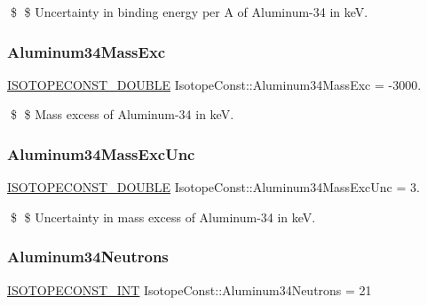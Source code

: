 \$ \$ Uncertainty in binding energy per A of Aluminum-\/34 in keV. \mbox{\label{group___isotope_const-_aluminum-_al34_ga94578f7b17ceed14c9016401747b8a04}} 
\subsubsection{\texorpdfstring{Aluminum34\+Mass\+Exc}{Aluminum34MassExc}}
{\footnotesize\ttfamily \mbox{\hyperlink{group___isotope_const-_macros_ga8f45a7272ce02c0b4c65c44636ed719a}{I\+S\+O\+T\+O\+P\+E\+C\+O\+N\+S\+T\+\_\+\+D\+O\+U\+B\+LE}} Isotope\+Const\+::\+Aluminum34\+Mass\+Exc = -\/3000.}

\$ \$ Mass excess of Aluminum-\/34 in keV. \mbox{\label{group___isotope_const-_aluminum-_al34_ga8a93d8df3b2d20cbdd15d4e8ef8bff64}} 
\subsubsection{\texorpdfstring{Aluminum34\+Mass\+Exc\+Unc}{Aluminum34MassExcUnc}}
{\footnotesize\ttfamily \mbox{\hyperlink{group___isotope_const-_macros_ga8f45a7272ce02c0b4c65c44636ed719a}{I\+S\+O\+T\+O\+P\+E\+C\+O\+N\+S\+T\+\_\+\+D\+O\+U\+B\+LE}} Isotope\+Const\+::\+Aluminum34\+Mass\+Exc\+Unc = 3.}

\$ \$ Uncertainty in mass excess of Aluminum-\/34 in keV. \mbox{\label{group___isotope_const-_aluminum-_al34_ga9a9e3f52482bb2b2a592e910a7a6a2fe}} 
\subsubsection{\texorpdfstring{Aluminum34\+Neutrons}{Aluminum34Neutrons}}
{\footnotesize\ttfamily \mbox{\hyperlink{group___isotope_const-_macros_ga5f18360b3e99483a35c32d789e62621c}{I\+S\+O\+T\+O\+P\+E\+C\+O\+N\+S\+T\+\_\+\+I\+NT}} Isotope\+Const\+::\+Aluminum34\+Neutrons = 21}

